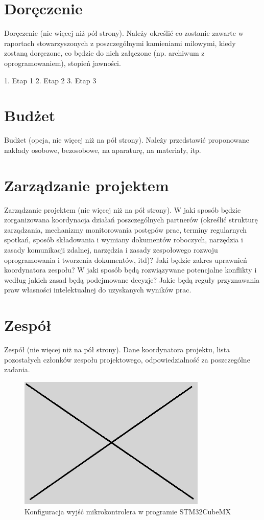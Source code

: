 \documentclass[10pt, a4paper]{article}
\begin{document}
\section{Doręczenie}
Doręczenie (nie więcej niż pół strony). Należy określić co zostanie zawarte w raportach stowarzyszonych z poszczególnymi kamieniami milowymi, kiedy zostaną doręczone, co będzie do nich załączone (np. archiwum z oprogramowaniem), stopień jawności.

1. Etap 1
2. Etap 2
3. Etap 3

\section{Budżet}
Budżet (opcja, nie więcej niż na pół strony). Należy przedstawić proponowane nakłady osobowe, bezosobowe, na aparaturę, na materiały, itp.

\section{Zarządzanie projektem}
Zarządzanie projektem (nie więcej niż na pół strony). W jaki sposób będzie zorganizowana koordynacja działań poszczególnych partnerów (określić strukturę zarządzania, mechanizmy monitorowania postępów prac, terminy regularnych spotkań, sposób składowania i wymiany dokumentów roboczych, narzędzia i zasady komunikacji zdalnej, narzędzia i zasady zespołowego rozwoju oprogramowania i tworzenia dokumentów, itd)? Jaki będzie zakres uprawnień koordynatora zespołu? W jaki sposób będą rozwiązywane potencjalne konflikty i według jakich zasad będą podejmowane decyzje? Jakie będą reguły przyznawania praw własności intelektualnej do uzyskanych wyników prac.

\section{Zespół}
Zespół (nie więcej niż na pół strony). Dane koordynatora projektu, lista pozostałych członków zespołu projektowego, odpowiedzialność za poszczególne zadania. 

\begin{figure}[H]
	\centering
	\includegraphics[width=0.8\textwidth]{figures/obraz.png}
	\caption{Konfiguracja wyjść mikrokontrolera w programie STM32CubeMX}
	\label{fig:KonfiguracjaMikrokontrolera}
\end{figure}
\end{document}
